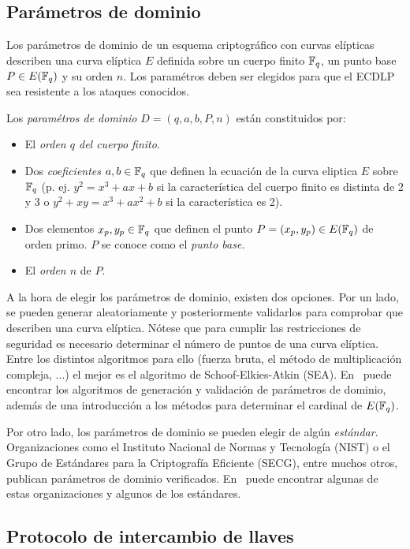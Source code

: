 \subsection{Parámetros de dominio}
\label{sub:Parámetros de dominio}

Los parámetros de dominio de un esquema criptográfico con curvas elípticas describen una curva elíptica $E$ definida sobre un cuerpo finito $\mathbb{F}_q$, un punto base $P \in E(\mathbb{F}_q)$ y su orden $n$. Los paramétros deben ser elegidos para que el ECDLP sea resistente a los ataques conocidos.

\begin{definicion}
    Los \emph{paramétros de dominio} $D = (q, a, b, P, n)$ están constituidos por:
    \begin{itemize}
        \item El \emph{orden $q$ del cuerpo finito}.
        \item Dos \emph{coeficientes} $a, b \in \mathbb{F}_q$ que definen la ecuación de la curva eliptica $E$ sobre $\mathbb{F}_q$ (p. ej. $y^2 = x^3 + a x + b$ si la característica del cuerpo finito es distinta de 2 y 3 o $y^2 + x y = x^3 + a x^2 + b$ si la característica es 2).
        \item Dos elementos $x_p, y_p \in \mathbb{F}_q$ que definen el punto $P = (x_p, y_p) \in E(\mathbb{F}_q)$ de orden primo. $P$ se conoce como el \emph{punto base}.
        \item El \emph{orden $n$} de $P$.
    \end{itemize}
\end{definicion}

A la hora de elegir los parámetros de dominio, existen dos opciones. Por un lado, se pueden generar aleatoriamente y posteriormente validarlos para comprobar que describen una curva elíptica. Nótese que para cumplir las restricciones de seguridad es necesario determinar el número de puntos de una curva elíptica. Entre los distintos algoritmos para ello (fuerza bruta, el método de multiplicación compleja, ...) el mejor es el algoritmo de Schoof-Elkies-Atkin (SEA). En~\cite[sec. 4]{Hankerson:2003} puede encontrar los algoritmos de generación y validación de parámetros de dominio, además de una introducción a los métodos para determinar el cardinal de $E(\mathbb{F}_q)$.

Por otro lado, los parámetros de dominio se pueden elegir de algún \emph{estándar}. Organizaciones como el Instituto Nacional de Normas y Tecnología (NIST) o el Grupo de Estándares para la Criptografía Eficiente (SECG), entre muchos otros, publican
parámetros de dominio verificados. En~\cite[apéndice B]{Hankerson:2003} puede encontrar algunas de estas organizaciones y algunos de los estándares.

\subsection{Protocolo de intercambio de llaves}
\label{sub:Protocolo de intercambio de llaves}

